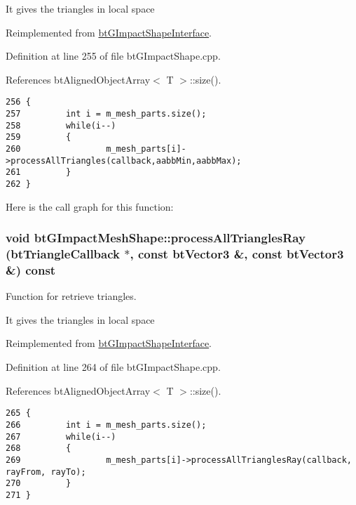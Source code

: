 It gives the triangles in local space 

Reimplemented from \hyperlink{classbt_g_impact_shape_interface_2faf9adce39854a9a66dd658f646be25}{btGImpactShapeInterface}.

Definition at line 255 of file btGImpactShape.cpp.

References btAlignedObjectArray$<$ T $>$::size().

\begin{Code}\begin{verbatim}256 {
257         int i = m_mesh_parts.size();
258         while(i--)
259         {
260                 m_mesh_parts[i]->processAllTriangles(callback,aabbMin,aabbMax);
261         }
262 }
\end{verbatim}
\end{Code}




Here is the call graph for this function:\hypertarget{classbt_g_impact_mesh_shape_80b60d4ca87b2739b2389258e901900d}{
\subsubsection[processAllTrianglesRay]{\setlength{\rightskip}{0pt plus 5cm}void btGImpactMeshShape::processAllTrianglesRay ({\bf btTriangleCallback} $\ast$, \/  const btVector3 \&, \/  const btVector3 \&) const}}
\label{classbt_g_impact_mesh_shape_80b60d4ca87b2739b2389258e901900d}


Function for retrieve triangles. 

It gives the triangles in local space 

Reimplemented from \hyperlink{classbt_g_impact_shape_interface_646ad13b4aa116d58df110c2f407e5a8}{btGImpactShapeInterface}.

Definition at line 264 of file btGImpactShape.cpp.

References btAlignedObjectArray$<$ T $>$::size().

\begin{Code}\begin{verbatim}265 {
266         int i = m_mesh_parts.size();
267         while(i--)
268         {
269                 m_mesh_parts[i]->processAllTrianglesRay(callback, rayFrom, rayTo);
270         }
271 }
\end{verbatim}
\end{Code}




